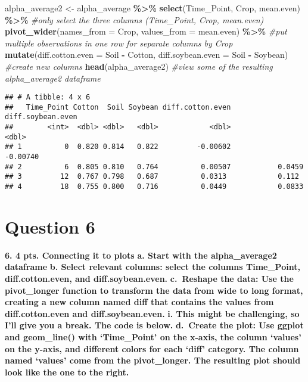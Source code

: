 \documentclass[
]{article}
\newenvironment{Shaded}{\begin{snugshade}}{\end{snugshade}}
\newcommand{\AttributeTok}[1]{\textcolor[rgb]{0.13,0.29,0.53}{#1}}
\newcommand{\CommentTok}[1]{\textcolor[rgb]{0.56,0.35,0.01}{\textit{#1}}}
\newcommand{\FunctionTok}[1]{\textcolor[rgb]{0.13,0.29,0.53}{\textbf{#1}}}
\newcommand{\NormalTok}[1]{#1}
\newcommand{\OtherTok}[1]{\textcolor[rgb]{0.56,0.35,0.01}{#1}}
\newcommand{\SpecialCharTok}[1]{\textcolor[rgb]{0.81,0.36,0.00}{\textbf{#1}}}
\begin{document}
\begin{Shaded}
\begin{Highlighting}[]
\NormalTok{alpha\_average2 }\OtherTok{\textless{}{-}}\NormalTok{ alpha\_average }\SpecialCharTok{\%\textgreater{}\%} 
  \FunctionTok{select}\NormalTok{(Time\_Point, Crop, mean.even) }\SpecialCharTok{\%\textgreater{}\%} \CommentTok{\#only select the three columns (Time\_Point, Crop, mean.even)}
  \FunctionTok{pivot\_wider}\NormalTok{(}\AttributeTok{names\_from =}\NormalTok{ Crop, }\AttributeTok{values\_from =}\NormalTok{ mean.even) }\SpecialCharTok{\%\textgreater{}\%}  \CommentTok{\#put multiple observations in one row for separate columns by Crop}
  \FunctionTok{mutate}\NormalTok{(}\AttributeTok{diff.cotton.even =}\NormalTok{ Soil }\SpecialCharTok{{-}}\NormalTok{ Cotton,}
         \AttributeTok{diff.soybean.even =}\NormalTok{ Soil }\SpecialCharTok{{-}}\NormalTok{ Soybean) }\CommentTok{\#create new columns }
\FunctionTok{head}\NormalTok{(alpha\_average2) }\CommentTok{\#view some of the resulting alpha\_average2 dataframe}
\end{Highlighting}
\end{Shaded}

\begin{verbatim}
## # A tibble: 4 x 6
##   Time_Point Cotton  Soil Soybean diff.cotton.even diff.soybean.even
##        <int>  <dbl> <dbl>   <dbl>            <dbl>             <dbl>
## 1          0  0.820 0.814   0.822         -0.00602          -0.00740
## 2          6  0.805 0.810   0.764          0.00507           0.0459 
## 3         12  0.767 0.798   0.687          0.0313            0.112  
## 4         18  0.755 0.800   0.716          0.0449            0.0833
\end{verbatim}

\section{Question 6}\label{question-6}

\textbf{6. 4 pts. Connecting it to plots} \textbf{a. Start with the
alpha\_average2 dataframe} \textbf{b. Select relevant columns: select
the columns Time\_Point, diff.cotton.even, and diff.soybean.even.}
\textbf{c.~Reshape the data: Use the pivot\_longer function to transform
the data from wide to long format, creating a new column named diff that
contains the values from diff.cotton.even and diff.soybean.even.}
\textbf{i. This might be challenging, so I'll give you a break. The code
is below.} \textbf{d.~Create the plot: Use ggplot and geom\_line() with
`Time\_Point' on the x-axis, the column `values' on the y-axis, and
different colors for each `diff' category. The column named `values'
come from the pivot\_longer. The resulting plot should look like the one
to the right.}
\end{document}

